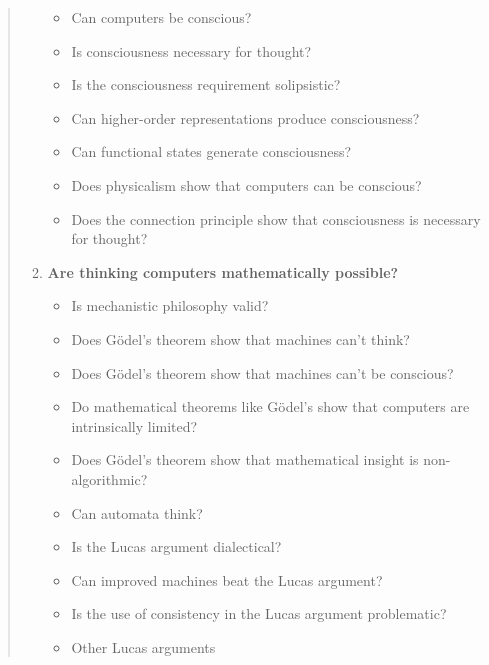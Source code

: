 \begin{quotation}
\begin{enumerate}
\begin{itemize}
        \item Can computers be conscious?
        \item Is consciousness necessary for thought?
        \item Is the consciousness requirement solipsistic?
        \item Can higher-order representations produce consciousness?
        \item Can functional states generate consciousness?
        \item Does physicalism show that computers can be conscious?
        \item Does the connection principle show that consciousness is necessary for thought?
      \end{itemize}
    \item \textbf{Are thinking computers mathematically possible?}
      \begin{itemize}
        \item Is mechanistic philosophy valid?
        \item Does G{\"o}del's theorem show that machines can't think?
        \item Does G{\"o}del's theorem show that machines can't be conscious?
        \item Do mathematical theorems like G{\"o}del's show that computers are intrinsically limited?
        \item Does G{\"o}del's theorem show that mathematical insight is non-algorithmic?
        \item Can automata think?
        \item Is the Lucas argument dialectical?
        \item Can improved machines beat the Lucas argument?
        \item Is the use of consistency in the Lucas argument problematic?
        \item Other Lucas arguments
      \end{itemize}
  \end{enumerate}
\end{quotation}